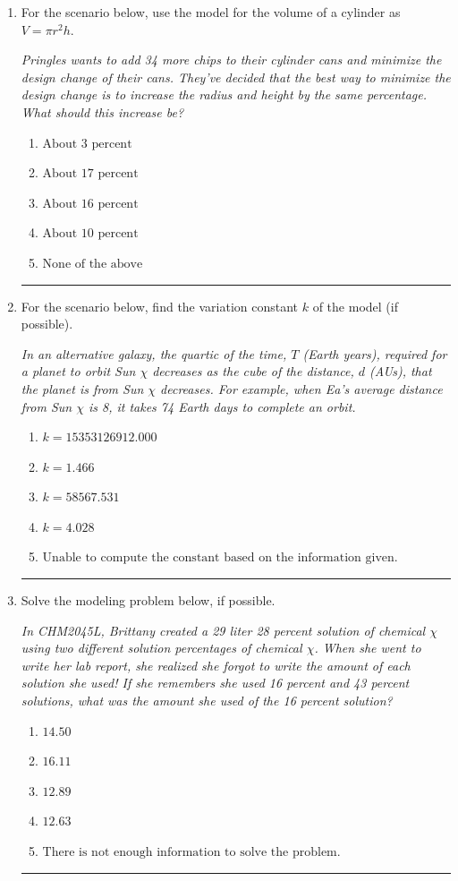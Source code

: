 \documentclass[14pt]{extbook}
\newcommand{\litem}[1]{\item#1\hspace*{-1cm}\rule{\textwidth}{0.4pt}}
\begin{document}
\begin{enumerate}
{\begin{enumerate}[label=\Alph*.]
\end{enumerate} }
\litem{
For the scenario below, use the model for the volume of a cylinder as $V = \pi r^2 h$.
\begin{center}
    \textit{ Pringles wants to add 34 \text{percent} more chips to their cylinder cans and minimize the design change of their cans. They've decided that the best way to minimize the design change is to increase the radius and height by the same percentage. What should this increase be? }
\end{center}
\begin{enumerate}[label=\Alph*.]
\item \( \text{About } 3 \text{ percent} \)
\item \( \text{About } 17 \text{ percent} \)
\item \( \text{About } 16 \text{ percent} \)
\item \( \text{About } 10 \text{ percent} \)
\item \( \text{None of the above} \)

\end{enumerate} }
\litem{
For the scenario below, find the variation constant $k$ of the model (if possible).
\begin{center}
    \textit{ In an alternative galaxy, the quartic of the time, $T$ (Earth years), required for a planet to orbit Sun $\chi$ decreases as the cube of the distance, $d$ (AUs), that the planet is from Sun $\chi$ decreases. For example, when Ea's average distance from Sun $\chi$ is 8, it takes 74 Earth days to complete an orbit. }
\end{center}
\begin{enumerate}[label=\Alph*.]
\item \( k = 15353126912.000 \)
\item \( k = 1.466 \)
\item \( k = 58567.531 \)
\item \( k = 4.028 \)
\item \( \text{Unable to compute the constant based on the information given.} \)

\end{enumerate} }
\litem{
Solve the modeling problem below, if possible.
\begin{center}
    \textit{ In CHM2045L, Brittany created a 29 liter 28 percent solution of chemical $\chi$ using two different solution percentages of chemical $\chi$. When she went to write her lab report, she realized she forgot to write the amount of each solution she used! If she remembers she used 16 percent and 43 percent solutions, what was the amount she used of the 16 percent solution? }
\end{center}
\begin{enumerate}[label=\Alph*.]
\item \( 14.50 \)
\item \( 16.11 \)
\item \( 12.89 \)
\item \( 12.63 \)
\item \( \text{There is not enough information to solve the problem.} \)


\end{enumerate}}
\end{enumerate}
\end{document}
